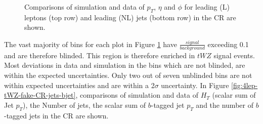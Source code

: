 \begin{figure}[htbp]
\begin{tabular}{ccc}
\end{tabular}
\caption{Comparisons of simulation and data of $p_{T}$, $\eta$ and $\phi$ for leading (L) leptons (top row) and leading (NL) jets (bottom row) in the \tWZfake CR are shown.}
\label{fig:4lep-tWZ-fake-CR-leptonPlots}
\end{figure}
The vast majority of bins for each plot in Figure \ref{fig:4lep-tWZ-fake-CR-leptonPlots} have $\frac{signal}{background}$ exceeding 0.1 and are therefore blinded. This region is therefore enriched in $tWZ$ signal events. Most deviations in data and simulation in the bins which are not blinded, are within the expected uncertainties. Only two out of seven unblinded bins are not within expected uncertainties and are within a 2$\sigma$ uncertainty. In Figure \ref{fig:4lep-tWZ-fake-CR-jets-bjet}, comparisons of simulation and data of $H_{T}$ (scalar sum of Jet $p_{T}$), the Number of jets, the scalar sum of $b$-tagged jet $p_{T}$ and the number of $b$-tagged jets in the \tWZfake CR are shown.


